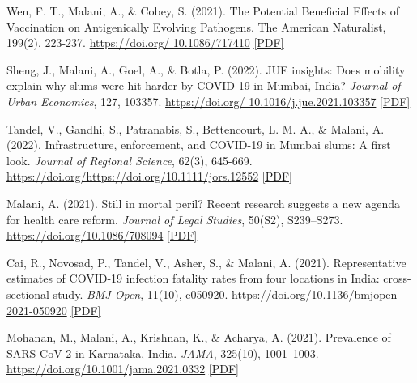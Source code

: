 \begin{tablist}
        \item[2022] \tab{}Wen, F. T., Malani, A., \& Cobey, S. (2021). The Potential Beneficial Effects of Vaccination on Antigenically Evolving Pathogens. The American Naturalist, 199(2), 223-237. \href{https://doi.org/10.1086/717410}{https://doi.org/ 10.1086/717410} \href{https://github.com/anup-malani/website_personal/blob/main/publications/2022_WenMalaniCobey_AmerNaturalist_FluEvolution.pdf}{[PDF]} 

        \item[2022] \tab{}Sheng, J., Malani, A., Goel, A., \& Botla, P. (2022). JUE insights: Does mobility explain why slums were hit harder by COVID-19 in Mumbai, India? \textit{Journal of Urban Economics}, 127, 103357. \href{https://doi.org/10.1016/j.jue.2021.103357}{https://doi.org/ 10.1016/j.jue.2021.103357} \href{https://github.com/anup-malani/website_personal/blob/main/publications/2022_ShengMalaniEtAl_JUE_SlumMobilityCOVID.pdf}{[PDF]}
        
        \item[2022] \tab{}Tandel, V., Gandhi, S., Patranabis, S., Bettencourt, L. M. A., \& Malani, A. (2022). Infrastructure, enforcement, and COVID-19 in Mumbai slums: A first look. \textit{Journal of Regional Science}, 62(3), 645-669. \href{https://doi.org/https://doi.org/10.1111/jors.12552}{https://doi.org/https://doi.org/10.1111/jors.12552} \href{https://github.com/anup-malani/website_personal/blob/main/publications/2022_ShengMalaniEtAl_JUE_SlumMobilityCOVID.pdf}{[PDF]} 

        \item[2021] \tab{}Malani, A. (2021). Still in mortal peril? Recent research suggests a new agenda for health care reform. \textit{Journal of Legal Studies}, 50(S2), S239–S273. \href{https://doi.org/10.1086/708094}{https://doi.org/10.1086/708094} \href{https://github.com/anup-malani/website_personal/blob/main/publications/2021_Malani_JLS_MortalPeril.pdf}{[PDF]}
        
        \item[2021] \tab{}Cai, R., Novosad, P., Tandel, V., Asher, S., \& Malani, A. (2021). Representative estimates of COVID-19 infection fatality rates from four locations in India: cross-sectional study. \textit{BMJ Open}, 11(10), e050920. \href{https://doi.org/10.1136/bmjopen-2021-050920}{https://doi.org/10.1136/bmjopen-2021-050920} \href{https://github.com/anup-malani/website_personal/blob/main/publications/2021_Malani_JLS_MortalPeril.pdf}{[PDF]}
        
        \item[2021] \tab{}Mohanan, M., Malani, A., Krishnan, K., \& Acharya, A. (2021). Prevalence of SARS-CoV-2 in Karnataka, India. \textit{JAMA}, 325(10), 1001–1003. \href{https://doi.org/10.1001/jama.2021.0332}{https://doi.org/10.1001/jama.2021.0332} \href{https://github.com/anup-malani/website_personal/blob/main/publications/2021_MohananMalani_JAMA_COVIDKarnatakaSero.pdf}{[PDF]}
        

\end{tablist}
